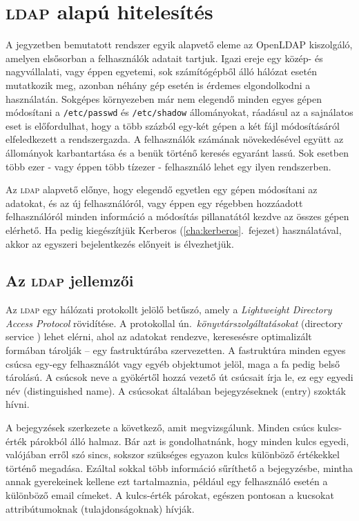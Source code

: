 \chapter{\textsc{ldap} alapú hitelesítés}\label{cha:ldap}

A jegyzetben bemutatott rendszer egyik alapvető eleme az OpenLDAP kiszolgáló, amelyen elsősorban a felhasználók adatait
tartjuk. Igazi ereje egy közép- és nagyvállalati, vagy éppen egyetemi, sok számítógépből álló hálózat esetén mutatkozik
meg, azonban néhány gép esetén is érdemes elgondolkodni a használatán. Sokgépes környezeben már nem elegendő  minden
egyes gépen módosítani a \texttt{/etc/passwd} és \texttt{/etc/shadow} állományokat, ráadásul az a sajnálatos eset is
előfordulhat, hogy a több százból egy-két gépen a két fájl módosításáról elfeledkezett a rendszergazda. A felhasználók
számának növekedésével együtt az állományok karbantartása és a benük történő keresés egyaránt lassú. Sok esetben több
ezer - vagy éppen több tízezer - felhasználó lehet egy ilyen rendszerben.

Az \textsc{ldap} alapvető előnye, hogy elegendő egyetlen egy gépen módosítani az adatokat, és az új felhasználóról, vagy
éppen egy régebben hozzáadott felhasználóról  minden információ a módosítás pillanatától kezdve az összes gépen
elérhető.  Ha pedig kiegészítjük Kerberos (\ref{cha:kerberos}.\ fejezet) használatával, akkor az egyszeri bejelentkezés
előnyeit is élvezhetjük.


\section{Az \textsc{ldap} jellemzői}

Az \textsc{ldap}  egy hálózati protokollt jelölő betűszó, amely a {\em Lightweight Directory Access Protocol}
rövidítése. A protokollal ún.\ \emph{könyvtárszolgáltatásokat}  (directory service \cite{dirservice}) lehet elérni, ahol
az adatokat rendezve, keresesésre optimalizált formában tárolják -- egy fastruktúrába szervezetten. A fastruktúra minden
egyes csúcsa egy-egy felhasználót vagy egyéb objektumot jelöl, maga a fa pedig belső tárolású. A csúcsok neve a
gyökértől hozzá vezető út csúcsait írja le, ez egy egyedi név (distinguished name). A csúcsokat általában bejegyzéseknek
(entry) szokták hívni.

A bejegyzések szerkezete a következő, amit megvizsgálunk. Minden csúcs kulcs-érték párokból álló halmaz. Bár azt is
gondolhatnánk, hogy minden kulcs egyedi, valójában erről szó sincs, sokszor szükséges egyazon kulcs különböző értékekkel
történő megadása. Ezáltal sokkal több információ sűríthető a bejegyzésbe, mintha annak gyerekeinek kellene ezt
tartalmaznia, például egy felhasználó esetén a különböző email címeket. A kulcs-érték párokat, egészen pontosan a
kucsokat attribútumoknak (tulajdonságoknak) hívják.

